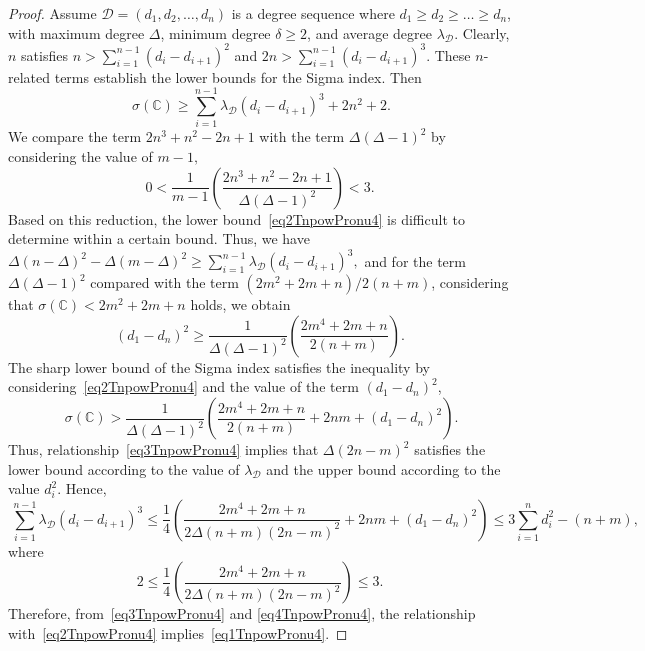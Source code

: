 \documentclass[12pt, a4paper]{article}
\theoremstyle{plain}  %
\theoremstyle{definition}  %
\newcommand{\CC}{\mathbb{C}}
\begin{document}
\begin{proof}
Assume $\mathscr{D}=(d_1,d_2,\dots,d_n)$ is a degree sequence where $d_1 \geqslant d_2 \geqslant \dots \geqslant d_n$, with maximum degree $\Delta$, minimum degree $\delta \geqslant 2$, and average degree $\lambda_{\mathscr{D}}$. Clearly, $n$ satisfies 
$n > \sum_{i=1}^{n-1}(d_i - d_{i+1})^2$ and $2n > \sum_{i=1}^{n-1}(d_i - d_{i+1})^3.$ 
These $n$-related terms establish the lower bounds for the Sigma index. Then
\begin{equation}~\label{eq2TnpowPronu4}
\sigma(\CC) \geqslant \sum_{i=1}^{n-1}\lambda_{\mathscr{D}} (d_i-d_{i+1})^3+2n^2+2.
\end{equation}
We compare the term $2n^3+n^2-2n+1$ with the term $\Delta(\Delta-1)^2$ by considering the value of $m-1,$
\[
0 < \frac{1}{m-1}\left(\frac{2n^3 + n^2 - 2n + 1}{\Delta(\Delta - 1)^2}\right) < 3. 
\]
Based on this reduction, the lower bound~\eqref{eq2TnpowPronu4} is difficult to determine within a certain bound. Thus, we have $\Delta (n - \Delta)^2 - \Delta (m - \Delta)^2 \geqslant \sum_{i=1}^{n-1}\lambda_{\mathscr{D}} (d_i - d_{i+1})^3,$
and for the term $\Delta(\Delta - 1)^2$ compared with the term $(2m^2 + 2m + n) / 2(n + m)$, considering that $\sigma(\CC) < 2m^2 + 2m + n$ holds, we obtain
\[
(d_1 - d_n)^2 \geqslant \frac{1}{\Delta(\Delta - 1)^2} \left(\frac{2m^4 + 2m + n}{2(n + m)} \right).
\]
The sharp lower bound of the Sigma index satisfies the inequality by considering~\eqref{eq2TnpowPronu4} and the value of the term $(d_1 - d_n)^2$,
\begin{equation}~\label{eq3TnpowPronu4}
\sigma(\CC) > \frac{1}{\Delta(\Delta - 1)^2} \left(\frac{2m^4 + 2m + n}{2(n + m)} + 2nm + (d_1 - d_n)^2 \right).
\end{equation}
Thus, relationship~\eqref{eq3TnpowPronu4} implies that $\Delta (2n - m)^2$ satisfies the lower bound according to the value of $\lambda_{\mathscr{D}}$ and the upper bound according to the value $d_i^2$. Hence,
\begin{equation}~\label{eq4TnpowPronu4}
\sum_{i=1}^{n-1} \lambda_{\mathscr{D}} (d_i - d_{i+1})^3 \leqslant \frac{1}{4}\left( \frac{2m^4 + 2m + n}{2 \Delta (n + m)(2n - m)^2} + 2nm + (d_1 - d_n)^2 \right) \leqslant 3 \sum_{i=1}^n d_i^2 - (n + m),
\end{equation}
where
\[
2 \leqslant \frac{1}{4} \left( \frac{2m^4 + 2m + n}{2 \Delta (n + m)(2n - m)^2} \right) \leqslant 3.
\]
Therefore, from~\eqref{eq3TnpowPronu4} and \eqref{eq4TnpowPronu4}, the relationship with~\eqref{eq2TnpowPronu4} implies~\eqref{eq1TnpowPronu4}.
\end{proof}
\end{document}
